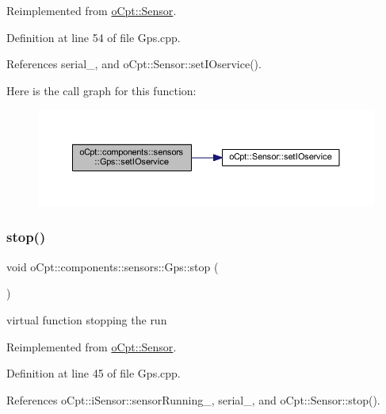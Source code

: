 Reimplemented from \hyperlink{classo_cpt_1_1_sensor_ae7d47e18df5eb7854bf71fbbee9568df}{o\+Cpt\+::\+Sensor}.



Definition at line 54 of file Gps.\+cpp.



References serial\+\_\+, and o\+Cpt\+::\+Sensor\+::set\+I\+Oservice().

Here is the call graph for this function\+:\nopagebreak
\begin{figure}[H]
\begin{center}
\leavevmode
\includegraphics[width=350pt]{classo_cpt_1_1components_1_1sensors_1_1_gps_ad613b81625402daa6fdae80022fde18c_cgraph}
\end{center}
\end{figure}
\hypertarget{classo_cpt_1_1components_1_1sensors_1_1_gps_a9206c32fa91311740ae920c01eed6094}{}\label{classo_cpt_1_1components_1_1sensors_1_1_gps_a9206c32fa91311740ae920c01eed6094} 
\subsubsection{\texorpdfstring{stop()}{stop()}}
{\footnotesize\ttfamily void o\+Cpt\+::components\+::sensors\+::\+Gps\+::stop (\begin{DoxyParamCaption}{ }\end{DoxyParamCaption})\hspace{0.3cm}{\ttfamily [virtual]}}

virtual function stopping the run 

Reimplemented from \hyperlink{classo_cpt_1_1_sensor_a44ad78c2c091ca9cf72295293f8c5b74}{o\+Cpt\+::\+Sensor}.



Definition at line 45 of file Gps.\+cpp.



References o\+Cpt\+::i\+Sensor\+::sensor\+Running\+\_\+, serial\+\_\+, and o\+Cpt\+::\+Sensor\+::stop().

